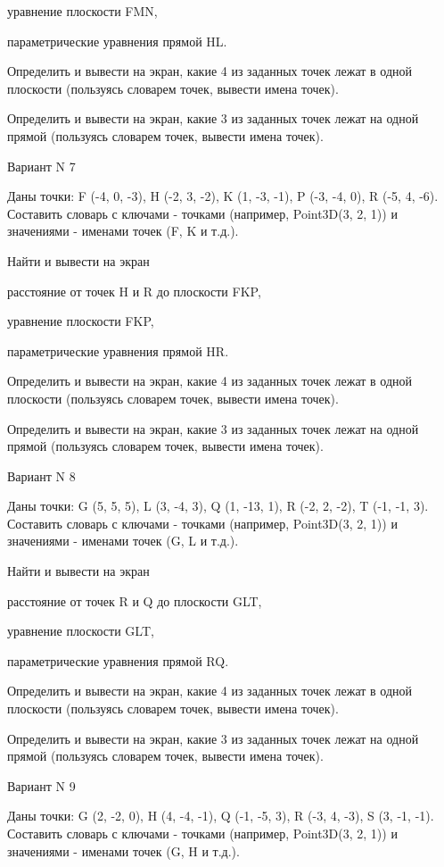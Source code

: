 \documentclass[11pt]{report}
\begin{document}
уравнение плоскости FMN,


параметрические уравнения прямой HL.


Определить и вывести на экран, какие 4 из заданных точек лежат в одной плоскости (пользуясь словарем точек, вывести имена точек).


Определить и вывести на экран, какие 3 из заданных точек лежат на одной прямой (пользуясь словарем точек, вывести имена точек).

\newpage
Вариант N 7

Даны точки: F (-4, 0, -3), H (-2, 3, -2), K (1, -3, -1), P (-3, -4, 0), R (-5, 4, -6).
Составить словарь с ключами - точками (например, Point3D(3, 2, 1)) и значениями - именами точек (F, K и т.д.).


Найти и вывести на экран


расстояние от точек H и R до плоскости FKP,


уравнение плоскости FKP,


параметрические уравнения прямой HR.


Определить и вывести на экран, какие 4 из заданных точек лежат в одной плоскости (пользуясь словарем точек, вывести имена точек).


Определить и вывести на экран, какие 3 из заданных точек лежат на одной прямой (пользуясь словарем точек, вывести имена точек).

\newpage
Вариант N 8

Даны точки: G (5, 5, 5), L (3, -4, 3), Q (1, -13, 1), R (-2, 2, -2), T (-1, -1, 3).
Составить словарь с ключами - точками (например, Point3D(3, 2, 1)) и значениями - именами точек (G, L и т.д.).


Найти и вывести на экран


расстояние от точек R и Q до плоскости GLT,


уравнение плоскости GLT,


параметрические уравнения прямой RQ.


Определить и вывести на экран, какие 4 из заданных точек лежат в одной плоскости (пользуясь словарем точек, вывести имена точек).


Определить и вывести на экран, какие 3 из заданных точек лежат на одной прямой (пользуясь словарем точек, вывести имена точек).

\newpage
Вариант N 9

Даны точки: G (2, -2, 0), H (4, -4, -1), Q (-1, -5, 3), R (-3, 4, -3), S (3, -1, -1).
Составить словарь с ключами - точками (например, Point3D(3, 2, 1)) и значениями - именами точек (G, H и т.д.).
\end{document}
